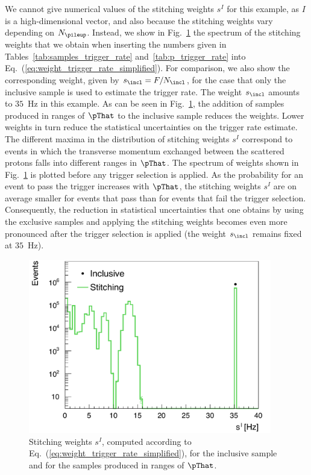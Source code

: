We cannot give numerical values of the stitching weights $s^{I}$ for this example,
as $I$ is a high-dimensional vector, and also because the stitching weights vary depending on $N_{\pileup}$.
Instead, we show in Fig.~\ref{fig:weight_trigger_rate} the spectrum of the stitching weights
that we obtain when inserting the numbers given in Tables~\ref{tab:samples_trigger_rate} and~\ref{tab:p_trigger_rate} into Eq.~(\ref{eq:weight_trigger_rate_simplified}).
For comparison, we also show the corresponding weight, given by $s_{\incl} = F/N_{\incl}$,
for the case that only the inclusive sample is used to estimate the trigger rate.
The weight $s_{\incl}$ amounts to $35$~Hz in this example.
As can be seen in Fig.~\ref{fig:weight_trigger_rate}, the addition of samples produced in ranges of $\pThat$ to the inclusive sample reduces the weights.
Lower weights in turn reduce the statistical uncertainties on the trigger rate estimate.
The different maxima in the distribution of stitching weights $s^{I}$ correspond to events 
in which the transverse momentum exchanged between the scattered protons falls into different ranges in $\pThat$.
The spectrum of weights shown in Fig.~\ref{fig:weight_trigger_rate} is plotted before any trigger selection is applied.
As the probability for an event to pass the trigger increases with $\pThat$,
the stitching weights $s^{I}$ are on average smaller for events that pass than for events that fail the trigger selection.
Consequently, the reduction in statistical uncertainties that one obtains by using the exclusive samples and applying the stitching weights 
becomes even more pronounced after the trigger selection is applied (the weight $s_{\incl}$ remains fixed at $35$~Hz).

\begin{figure}
\setlength{\unitlength}{1mm}
\begin{center}
\includegraphics*[height=76mm]{plots/makeEvtWeightPlotsForPaper_evtWeight_log_modified.pdf}
\end{center}
\caption{
  Stitching weights $s^{I}$, computed according to Eq.~(\ref{eq:weight_trigger_rate_simplified}), 
  for the inclusive sample and for the samples produced in ranges of $\pThat$.
}
\label{fig:weight_trigger_rate}
\end{figure}

